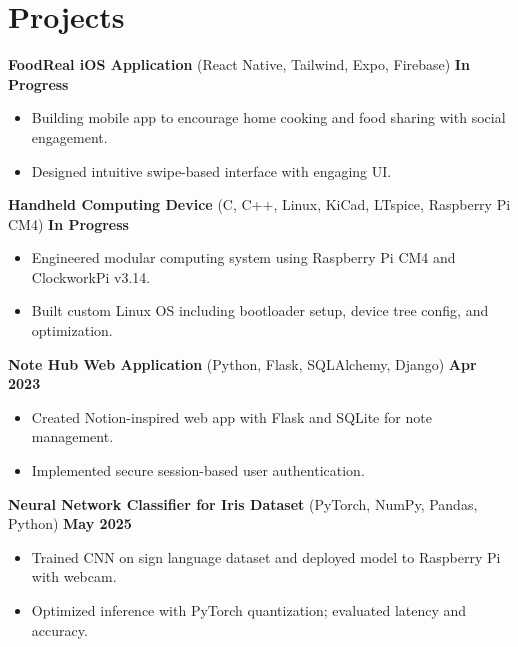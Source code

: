 \documentclass[letterpaper,11pt]{article}
\begin{document}
\section*{Projects}
\textbf{FoodReal iOS Application} (React Native, Tailwind, Expo, Firebase) \hfill \textbf{In Progress}
\begin{itemize}
    \item Building mobile app to encourage home cooking and food sharing with social engagement.
    \item Designed intuitive swipe-based interface with engaging UI.
\end{itemize}
\vspace{4mm}
\textbf{Handheld Computing Device} (C, C++, Linux, KiCad, LTspice, Raspberry Pi CM4) \hfill \textbf{In Progress}
\begin{itemize}
    \item Engineered modular computing system using Raspberry Pi CM4 and ClockworkPi v3.14.
    \item Built custom Linux OS including bootloader setup, device tree config, and optimization.
\end{itemize}
\vspace{4mm}
\textbf{Note Hub Web Application} (Python, Flask, SQLAlchemy, Django) \hfill \textbf{Apr 2023}
\begin{itemize}
    \item Created Notion-inspired web app with Flask and SQLite for note management.
    \item Implemented secure session-based user authentication.
\end{itemize}
\vspace{4mm}
\textbf{Neural Network Classifier for Iris Dataset} (PyTorch, NumPy, Pandas, Python) \hfill \textbf{May 2025}
\begin{itemize}
    \item Trained CNN on sign language dataset and deployed model to Raspberry Pi with webcam.
    \item Optimized inference with PyTorch quantization; evaluated latency and accuracy.
\end{itemize}
\vspace{4mm}
\end{document}
